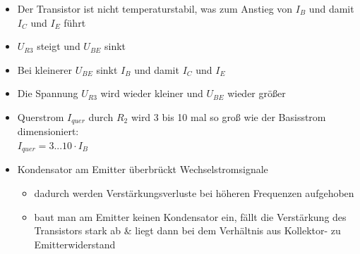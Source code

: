 \begin{frame}
      \begin{minipage}{0.5\textwidth}
	    \begin{itemize}
	        \item Der Transistor ist nicht temperaturstabil, was zum Anstieg von $I_B$ und damit $I_C$ und $I_E$ führt
	        \item $U_{R3}$ steigt und $U_{BE}$ sinkt
	        \item Bei kleinerer $U_{BE}$ sinkt $I_B$ und damit $I_C$ und $I_E$
	        \item Die Spannung $U_{R3}$ wird wieder kleiner und $U_{BE}$ wieder größer
	    \end{itemize}
      \end{minipage}
\end{frame}

\begin{frame}
	\begin{itemize}
		\item Querstrom $I_{quer}$ durch $R_2$ wird 3 bis 10 mal so groß wie der
              Basisstrom dimensioniert: \\
		
        $I_{quer} = 3 ... 10 \cdot I_B$
		
        \item Kondensator am Emitter überbrückt Wechselstromsignale
        \begin{itemize}
		    \item dadurch werden Verstärkungsverluste bei höheren Frequenzen aufgehoben
            \item baut man am Emitter keinen Kondensator ein, fällt die Verstärkung des
                  Transistors stark ab \& liegt dann bei dem Verhältnis aus Kollektor- zu
                  Emitterwiderstand
        \end{itemize}
	\end{itemize}
\end{frame}

